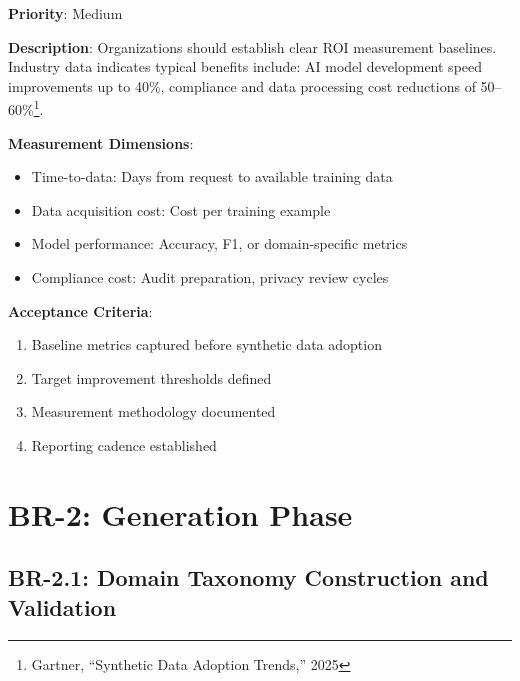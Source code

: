 \begin{tcolorbox}[colback=blue!5,colframe=blue!70,title=BR-1.5: Investment Return Baseline]
\textbf{Priority}: Medium

\textbf{Description}: Organizations should establish clear ROI measurement
baselines. Industry data indicates typical benefits include: AI model development
speed improvements up to 40\%, compliance and data processing cost reductions
of 50--60\%\footnote{Gartner, ``Synthetic Data Adoption Trends,'' 2025}.

\textbf{Measurement Dimensions}:
\begin{itemize}
  \item Time-to-data: Days from request to available training data
  \item Data acquisition cost: Cost per training example
  \item Model performance: Accuracy, F1, or domain-specific metrics
  \item Compliance cost: Audit preparation, privacy review cycles
\end{itemize}

\textbf{Acceptance Criteria}:
\begin{enumerate}
  \item Baseline metrics captured before synthetic data adoption
  \item Target improvement thresholds defined
  \item Measurement methodology documented
  \item Reporting cadence established
\end{enumerate}
\end{tcolorbox}


\section{BR-2: Generation Phase}

\subsection{BR-2.1: Domain Taxonomy Construction and Validation}

